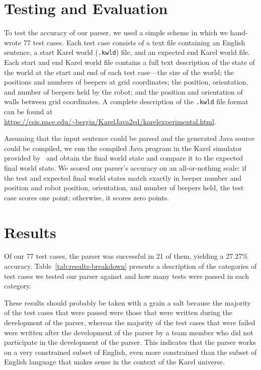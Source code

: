 \documentclass[11pt]{article}
\begin{document}
\section{Testing and Evaluation}
To test the accuracy of our parser, we used a simple scheme in which we hand-wrote 77 test cases.
Each test case consists of a text file containing an English sentence, a start Karel world
(\texttt{.kwld}) file, and an expected end Karel world file. Each start and end Karel world file
contains a full text description of the state of the world at the start and end of each test
case---the size of the world; the positions and numbers of beepers at grid coordinates; the
position, orientation, and number of beepers held by the robot; and the position and orientation of
walls between grid coordinates. A complete description of the \texttt{.kwld} file format can be
found at \url{https://csis.pace.edu/~bergin/KarelJava2ed/karelexperimental.html}.

Assuming that the input sentence could be parsed and the generated Java source could be compiled,
we run the compiled Java program in the Karel simulator provided by~ and
obtain the final world state and compare it to the expected final world state. We scored our
parser's accuracy on an all-or-nothing scale: if the test and expected final world states match
exactly in beeper number and position and robot position, orientation, and number of beepers held,
the test case scores one point; otherwise, it scores zero points.

\section{Results}
Of our 77 test cases, the parser was successful in 21 of them, yielding a 27.27\% accuracy.
Table~\ref{tab:results-breakdown} presents a description of the categories of test cases we tested
our parser against and how many tests were passed in each category.

These results should probably be taken with a grain a salt because the majority of the
test cases that were passed were those that were written during the development of the parser,
whereas the majority of the test cases that were failed were written after the development of the
parser by a team member who did not participate in the development of the parser. This indicates
that the parser works on a very constrained subset of English, even more constrained than the
subset of English language that makes sense in the context of the Karel universe.
\end{document}
